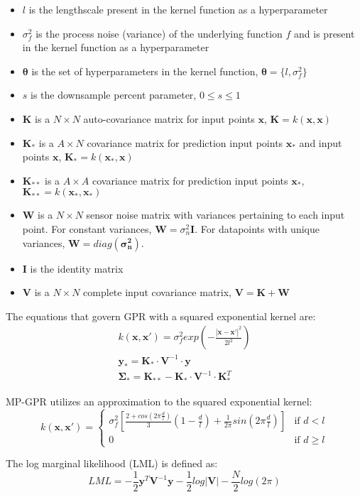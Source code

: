 \begin{itemize}[noitemsep, nolistsep]
    \item $l$ is the lengthscale present in the kernel function as a hyperparameter
    \item $\sigma_f^2$ is the process noise (variance) of the underlying function $f$ and is present in the kernel function as a hyperparameter
    \item $\boldsymbol{\theta}$ is the set of hyperparameters in the kernel function, $\boldsymbol{\theta} = \{l,\sigma_f^2\}$
    \item $s$ is the downsample percent parameter, $0 \leq s \leq 1$
    \item $\boldsymbol{K}$ is a $N \times N$ auto-covariance matrix for input points $\boldsymbol{x}$, $\boldsymbol{K} = k(\boldsymbol{x},\boldsymbol{x})$
    \item $\boldsymbol{K}_{\ast}$ is a $A \times N$ covariance matrix for prediction input points $\boldsymbol{x_{\ast}}$ and input points $\boldsymbol{x}$, $\boldsymbol{K_{\ast}} = k(\boldsymbol{x_{\ast}},\boldsymbol{x})$
    \item $\boldsymbol{K}_{\ast\ast}$ is a $A \times A$ covariance matrix for prediction input points $\boldsymbol{x}_{\ast}$, $\boldsymbol{K}_{\ast\ast} = k(\boldsymbol{x}_{\ast},\boldsymbol{x}_{\ast})$
    \item $\boldsymbol{W}$ is a $N \times N$ sensor noise matrix with variances pertaining to each input point. For constant variances, $\boldsymbol{W} = \sigma_n^2 \boldsymbol{I}$. For datapoints with unique variances, $\boldsymbol{W} = diag(\boldsymbol{\sigma_n^2})$.
    \item $\boldsymbol{I}$ is the identity matrix
    \item $\boldsymbol{V}$ is a $N \times N$ complete input covariance matrix, $\boldsymbol{V} = \boldsymbol{K} + \boldsymbol{W}$
\end{itemize}

The equations that govern GPR with a squared exponential kernel are:
\begin{gather*}
    k(\boldsymbol{x},\boldsymbol{x'}) = \sigma_f^2 exp(-\frac{|\boldsymbol{x}-\boldsymbol{x'}|^2}{2l^2}) \\
    \boldsymbol{y}_{\ast} = \boldsymbol{K}_{\ast} \cdot \boldsymbol{V}^{-1} \cdot \boldsymbol{y} \\
    \boldsymbol{\Sigma}_{\ast} = \boldsymbol{K}_{\ast\ast} - \boldsymbol{K}_{\ast} \cdot \boldsymbol{V}^{-1} \cdot \boldsymbol{K}_{\ast}^T
\end{gather*}

MP-GPR utilizes an approximation to the squared exponential kernel:
\begin{equation}
  k(\boldsymbol{x},\boldsymbol{x'}) =
    \begin{cases}
      \sigma_f^2[\frac{2+cos(2\pi\frac{d}{l})}{3}(1-\frac{d}{l})+\frac{1}{2\pi}sin(2\pi\frac{d}{l})] & \text{if $d < l$}\\
      0 & \text{if $d \geq l$} 
    \end{cases}       
\end{equation}

The log marginal likelihood (LML) is defined as:
\begin{equation}
    LML = -\frac{1}{2} \boldsymbol{y}^T \boldsymbol{V}^{-1} \boldsymbol{y} - \frac{1}{2}log|\boldsymbol{V}| - \frac{N}{2}log(2\pi)
\end{equation}